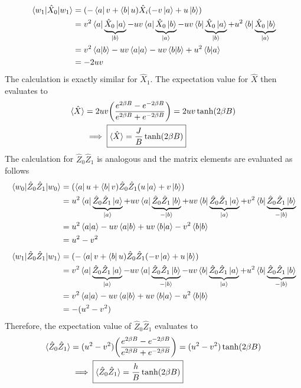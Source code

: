 \documentclass[../thesis_main.tex]{subfiles}
\begin{document}
\begin{align*}
    \mel{w_1}{\hat{X}_0}{w_1} & = (-\bra{a}v + \bra{b} u) \hat{X}_i (-v \ket{a} + u \ket{b}) \\
    & = v^2 \bra{a}\underbrace{{\hat{X}_0}\ket{a}}_{\ket{b}} -  uv \bra{a}\underbrace{{\hat{X}_0}\ket{b}}_{\ket{a}} - uv \bra{b}\underbrace{{\hat{X}_0}\ket{a}}_{\ket{b}} + u^2 \bra{b}\underbrace{{\hat{X}_0}\ket{b}}_{\ket{a}} \\ 
    & = v^2 \braket{a}{b} - uv \braket{a}{a} - uv \braket{b}{b} + u^2\braket{b}{a} \\
    & = -2uv
\end{align*} 
The calculation is exactly similar for $\hat{X}_1$. The expectation value for $\hat{X}$  then evaluates to 
\begin{align}
    \langle \hat{X} \rangle & = 2uv \qty(\frac{e^{2\beta B} - e^{-2\beta B}}{e^{2\beta B} + e^{-2\beta B}}) = 2uv \tanh (2\beta B) \nonumber \\ 
    & \implies \boxed{\langle{\hat{X}}\rangle = \frac{J}{B} \tanh(2\beta B)}
    \label{X-hat_expval}
\end{align}
The calculation for $\hat{Z}_0 \hat{Z}_1$ is analogous and the matrix elements are evaluated as follows
\begin{align*}
    \mel{w_0}{\hat{Z}_0 \hat{Z}_1}{w_0} & = (\bra{a} u + \bra{b} v) \hat{Z}_0 \hat{Z}_1 (u \ket{a} + v \ket{b}) \\
    & = u^2 \bra{a}\underbrace{{\hat{Z}_0 \hat{Z}_1}\ket{a}}_{\ket{a}} +  uv \bra{a}\underbrace{{\hat{Z}_0 \hat{Z}_1}\ket{b}}_{-\ket{b}} + uv \bra{b}\underbrace{{\hat{Z}_0 \hat{Z}_1}\ket{a}}_{\ket{a}} + v^2 \bra{b}\underbrace{{\hat{Z}_0 \hat{Z}_1}\ket{b}}_{-\ket{b}} \\ 
    & = u^2 \braket{a}{a} - uv \braket{a}{b} + uv \braket{b}{a} - v^2\braket{b}{b} \\
    & = u^2 - v^2
\end{align*} 
\begin{align*}
    \mel{w_1}{\hat{Z}_0 \hat{Z}_1}{w_1} & = (-\bra{a}v + \bra{b} u) \hat{Z}_0 \hat{Z}_1 (-v \ket{a} + u \ket{b}) \\
    & = v^2 \bra{a}\underbrace{{\hat{Z}_0 \hat{Z}_1}\ket{a}}_{\ket{a}} -  uv \bra{a}\underbrace{{\hat{Z}_0 \hat{Z}_1}\ket{b}}_{-\ket{b}} - uv \bra{b}\underbrace{{\hat{Z}_0 \hat{Z}_1}\ket{a}}_{\ket{a}} + u^2 \bra{b}\underbrace{{\hat{Z}_0 \hat{Z}_1}\ket{b}}_{-\ket{b}} \\ 
    & = v^2 \braket{a}{a} - uv \braket{a}{b} + uv \braket{b}{a} - u^2\braket{b}{b} \\
    & = -(u^2 - v^2)
\end{align*}
Therefore, the expectation value of $\hat{Z}_0 \hat{Z}_1$ evaluates to 
\begin{align}
    \langle \hat{Z}_0 \hat{Z}_1 \rangle & = (u^2-v^2) \qty(\frac{e^{2\beta B} - e^{-2\beta B}}{e^{2\beta B} + e^{-2\beta B}}) = (u^2-v^2) \tanh (2\beta B) \nonumber \\ 
    & \implies \boxed{\langle{\hat{Z}_0 \hat{Z}_1}\rangle = \frac{h}{B} \tanh(2\beta B)}
    \label{ZZ-hat_expval}
\end{align}
\end{document}
